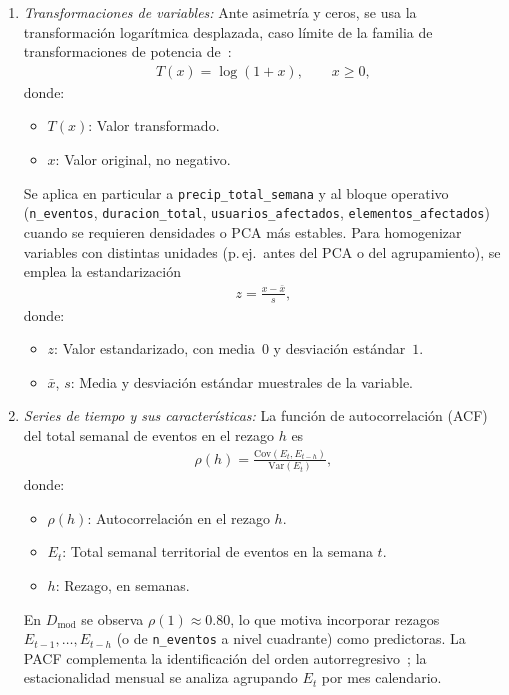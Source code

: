 \begin{enumerate}
    \item \textit{Transformaciones de variables:}
    Ante asimetría y ceros, se usa la transformación logarítmica desplazada, caso límite de la familia de transformaciones de potencia de~\cite{ref51}:
    \begin{equation}
        \begin{aligned}
        T(x) = \log(1 + x), \qquad x \geq 0,
        \end{aligned}
        \label{eq:log1p}
    \end{equation}
    donde:
    \begin{itemize}
        \item $T(x)$: Valor transformado.
        \item $x$: Valor original, no negativo.
    \end{itemize}
    Se aplica en particular a \texttt{precip\_total\_semana} y al bloque operativo (\texttt{n\_eventos}, \texttt{duracion\_total}, \texttt{usuarios\_afectados}, \texttt{elementos\_afectados}) cuando se requieren densidades o PCA más estables. Para homogenizar variables con distintas unidades (p.\,ej.\ antes del PCA o del agrupamiento), se emplea la estandarización
    \begin{equation}
        \begin{aligned}
        z = \frac{x - \bar{x}}{s},
        \end{aligned}
        \label{eq:zscore}
    \end{equation}
    donde:
    \begin{itemize}
        \item $z$: Valor estandarizado, con media~$0$ y desviación estándar~$1$.
        \item $\bar{x}$, $s$: Media y desviación estándar muestrales de la variable.
    \end{itemize}

    \item \textit{Series de tiempo y sus características:}
    La función de autocorrelación (ACF) del total semanal de eventos en el rezago $h$ es
    \begin{equation}
        \begin{aligned}
        \rho(h) = \frac{\mathrm{Cov}(E_t, E_{t-h})}{\mathrm{Var}(E_t)},
        \end{aligned}
        \label{eq:acf}
    \end{equation}
    donde:
    \begin{itemize}
        \item $\rho(h)$: Autocorrelación en el rezago $h$.
        \item $E_t$: Total semanal territorial de eventos en la semana $t$.
        \item $h$: Rezago, en semanas.
    \end{itemize}
    En $D_{\mathrm{mod}}$ se observa $\rho(1)\approx 0{.}80$, lo que motiva incorporar rezagos $E_{t-1},\ldots,E_{t-h}$ (o de \texttt{n\_eventos} a nivel cuadrante) como predictoras. La PACF complementa la identificación del orden autorregresivo~\cite{ref52}; la estacionalidad mensual se analiza agrupando $E_t$ por mes calendario.


\end{enumerate}
